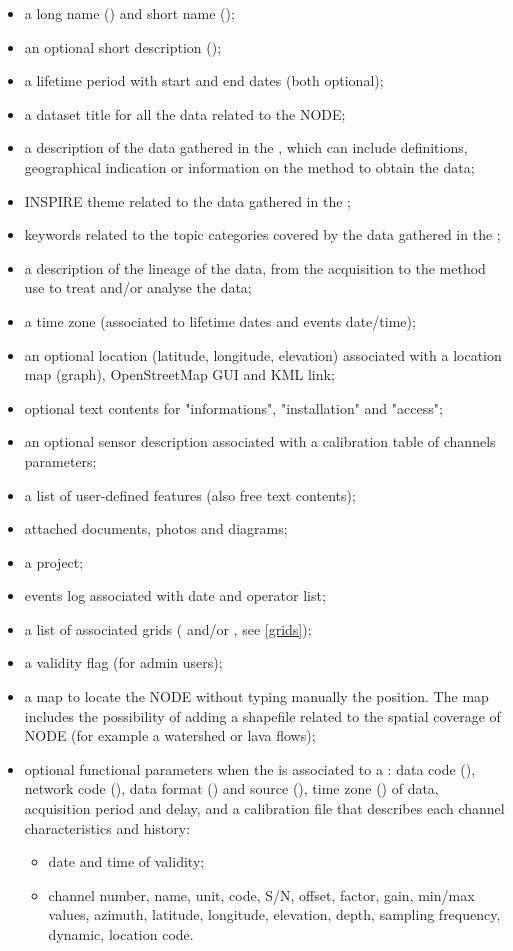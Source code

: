 \begin{itemize}
\item    a long name () and short name ();
\item    an optional short description ();
\item    a lifetime period with start and end dates (both optional);
\item	 a dataset title for all the data related to the NODE;
\item 	 a description of the data gathered in the , which can include definitions, geographical indication or information on the method to obtain the data;
\item 	 INSPIRE theme related to the data gathered in the ;
\item 	 keywords related to the topic categories covered by the data gathered in the ;
\item 	 a description of the lineage of the data, from the acquisition to the method use to treat and/or analyse the data;
\item    a time zone (associated to lifetime dates and events date/time);
\item    an optional location (latitude, longitude, elevation) associated with a location map (graph), OpenStreetMap GUI and KML link;
\item    optional text contents for "informations", "installation" and "access";
\item    an optional sensor description associated with a calibration table of channels parameters;
\item    a list of user-defined features (also free text contents);
\item    attached documents, photos and diagrams;
\item    a project;
\item    events log associated with date and operator list;
\item    a list of associated grids ( and/or , see \ref{grids});
\item    a validity flag (for admin users);
\item 	 a map to locate the NODE without typing manually the position. The map includes the possibility of adding a shapefile related to the spatial coverage of NODE (for example a watershed or lava flows); 
\item	 optional functional parameters when the  is associated to a : data code (), network code (), data format () and source (), time zone () of data, acquisition period and delay, and a calibration file that describes each channel characteristics and history:
	\begin{itemize}
	\item    date and time of validity;
	\item    channel number, name, unit, code, S/N, offset, factor, gain, min/max values, azimuth, latitude, longitude, elevation, depth, sampling frequency, dynamic, location code.
	\end{itemize}
\end{itemize}

